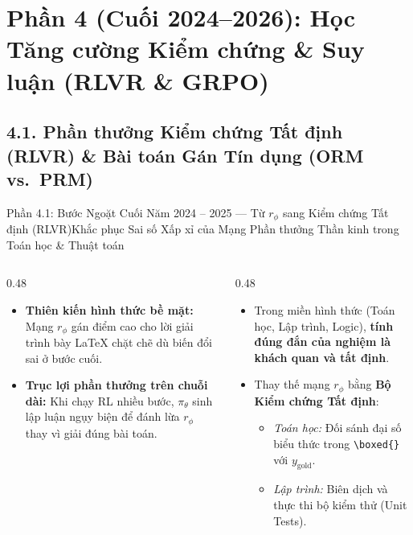 \section{Phần 4 (Cuối 2024--2026): Học Tăng cường Kiểm chứng \& Suy luận (RLVR \& GRPO)}

\subsection{4.1. Phần thưởng Kiểm chứng Tất định (RLVR) \& Bài toán Gán Tín dụng (ORM vs.\ PRM)}

\begin{frame}{Phần 4.1: Bước Ngoặt Cuối Năm 2024 -- 2025 --- Từ $r_\phi$ sang Kiểm chứng Tất định (RLVR)}{Khắc phục Sai số Xấp xỉ của Mạng Phần thưởng Thần kinh trong Toán học \& Thuật toán}
  \begin{columns}[T,onlytextwidth]
    \begin{column}{0.48\textwidth}
      \footnotesize
      \begin{itemize}\setlength{\itemsep}{6pt}
        \item \textbf{Thiên kiến hình thức bề mặt:} Mạng $r_\phi$ gán điểm cao cho lời giải trình bày LaTeX chặt chẽ dù biến đổi sai ở bước cuối.
        \item \textbf{Trục lợi phần thưởng trên chuỗi dài:} Khi chạy RL nhiều bước, $\pi_\theta$ sinh lập luận ngụy biện để đánh lừa $r_\phi$ thay vì giải đúng bài toán.
      \end{itemize}
    \end{column}
    \begin{column}{0.48\textwidth}
      \footnotesize
      \begin{itemize}\setlength{\itemsep}{6pt}
        \item Trong miền hình thức (Toán học, Lập trình, Logic), \textbf{tính đúng đắn của nghiệm là khách quan và tất định}.
        \item Thay thế mạng $r_\phi$ bằng \textbf{Bộ Kiểm chứng Tất định}:
          \begin{itemize}\scriptsize\setlength{\itemsep}{3pt}
            \item \textit{Toán học:} Đối sánh đại số biểu thức trong \texttt{\textbackslash boxed\{\}} với $y_{\text{gold}}$.
            \item \textit{Lập trình:} Biên dịch và thực thi bộ kiểm thử (Unit Tests).
          \end{itemize}
      \end{itemize}
    \end{column}
  \end{columns}
\end{frame}


